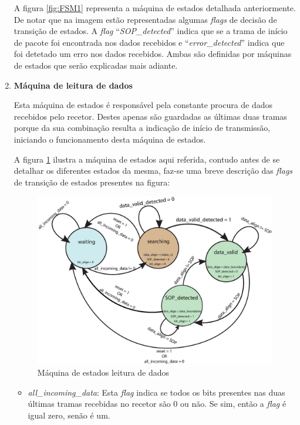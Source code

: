 \documentclass[11pt,a4paper]{article}
\begin{document}
\begin{enumerate}
		A figura \ref{fig:FSM1} representa a máquina de estados detalhada anteriormente. De notar que na imagem estão representadas algumas \textit{flags} de decisão de transição de estados. A \textit{flag} ``\textit{SOP\_detected}'' indica que se a trama de início de pacote foi encontrada nos dados recebidos e ``\textit{error\_detected}'' indica que foi detetado um erro nos dados recebidos. Ambas são definidas por máquinas de estados que serão explicadas mais adiante.
		
		
		\item \textbf{Máquina de leitura de dados}
		
		Esta máquina de estados é responsável pela constante procura de dados recebidos pelo recetor. Destes apenas são guardadas as últimas duas tramas porque da sua combinação resulta a indicação de início de transmissão, iniciando o funcionamento desta máquina de estados.
		
		A figura \ref{fig:fsm2} ilustra a máquina de estados aqui referida, contudo antes de se detalhar os diferentes estados da mesma, faz-se uma breve descrição das \textit{flags} de transição de estados presentes na figura:
		
		\begin{figure}[h!]
			\begin{center}
				\leavevmode
				\includegraphics[width=1.0\textwidth]{fsm_track_data}
				\caption[Máquina de estados leitura de dados]{Máquina de estados leitura de dados}
				\label{fig:fsm2}
			\end{center}
		\end{figure}
		
		\begin{itemize}
			\item \textit{all\_incoming\_data}: Esta \textit{flag} indica se todos os bits presentes nas duas últimas tramas recebidas no recetor são 0 ou não. Se sim, então a \textit{flag} é igual zero, senão é um.
			

\end{itemize}
\end{enumerate}
\end{document}
